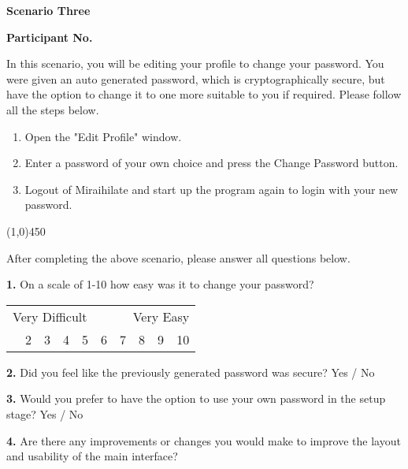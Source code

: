 \begin{center}
	\textbf{Scenario Three}\par
	\textbf{Participant No.}\par
\end{center}

In this scenario, you will be editing your profile to change your password. You were given an auto generated password, which is cryptographically secure, but have the option to change it to one more suitable to you if required. Please follow all the steps below.

\vspace{0.5cm}

\begin{enumerate}
	\item{Open the "Edit Profile" window.}
	\item{Enter a password of your own choice and press the Change Password button.}
	\item{Logout of Miraihilate and start up the program again to login with your new password.}
\end{enumerate}

\begin{center}
	\line(1,0){450}
\end{center}

After completing the above scenario, please answer all questions below.

\vspace{0.5cm}

\textbf{1.} On a scale of 1-10 how easy was it to change your password?

\begin{table}[h]
	\centering
	\begin{tabularx}{\textwidth}{XXXXXXXXXX}
		\multicolumn{5}{l}{Very Difficult} & \multicolumn{5}{r}{Very Easy} \\
		\centering
		1    & 2    & 3    & 4    & 5    & 6    & 7    & 8    & 9    & 10
	\end{tabularx}
\end{table}

\textbf{2.} Did you feel like the previously generated password was secure? \tab Yes / No

\vspace{0.5cm}

\textbf{3.} Would you prefer to have the option to use your own password in the setup stage? \tab Yes / No

\vspace{0.5cm}

\textbf{4.} Are there any improvements or changes you would make to improve the layout and usability of the main interface?

\vspace{3cm}
